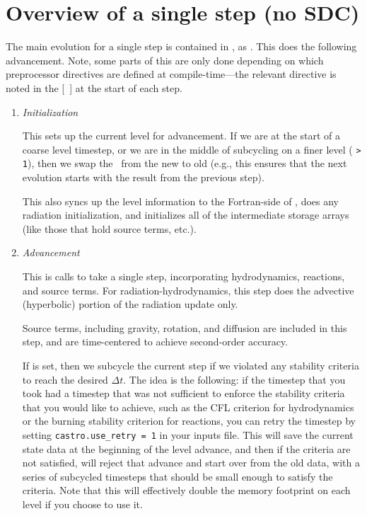 
\section{Overview of a single step (no SDC)}
\label{flow:sec:nosdc}

The main evolution for a single step is contained in
, as .  This does
the following advancement.  Note, some parts of this are only done
depending on which preprocessor directives are defined at
compile-time---the relevant directive is noted in the [\ ] at the start
of each step.

\begin{enumerate}
\item {\em Initialization} 

  This sets up the current level for advancement.  If we are at the
  start of a coarse level timestep, or we are in the middle of
  subcycling on a finer level ( {\tt > 1}), then
  we swap the \statedata\ from the new to old (e.g., this ensures that
  the next evolution starts with the result from the previous step).

  This also syncs up the level information to the Fortran-side of
  \castro, does any radiation initialization, and initializes all of
  the intermediate storage arrays (like those that hold source terms,
  etc.).

\item {\em Advancement} 

  This is calls  to take a single step,
  incorporating hydrodynamics, reactions, and source terms.  For
  radiation-hydrodynamics, this step does the advective (hyperbolic)
  portion of the radiation update only.

  Source terms, including gravity, rotation, and diffusion are
  included in this step, and are time-centered to achieve second-order
  accuracy.

  If  is set, then we subcycle the current
  step if we violated any stability criteria to reach the desired
  $\Delta t$.  The idea is the following: if the timestep that you
  took had a timestep that was not sufficient to enforce the stability
  criteria that you would like to achieve, such as the CFL criterion
  for hydrodynamics or the burning stability criterion for reactions,
  you can retry the timestep by setting {\tt castro.use\_retry = 1} in
  your inputs file. This will save the current state data at the
  beginning of the level advance, and then if the criteria are not
  satisfied, will reject that advance and start over from the old
  data, with a series of subcycled timesteps that should be small
  enough to satisfy the criteria.  Note that this will effectively
  double the memory footprint on each level if you choose to use it.



\end{enumerate}
